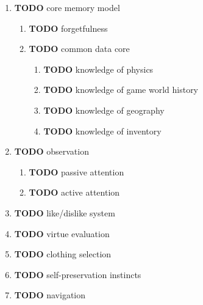 \documentclass[11pt]{article}
\begin{document}
\begin{enumerate}
\begin{enumerate}
\begin{enumerate}
\begin{enumerate}
\begin{enumerate}
\item {\bfseries\sffamily TODO} core memory model
\label{sec-5-4-1-4-3-6-3}

\begin{enumerate}
\item {\bfseries\sffamily TODO} forgetfulness
\label{sec-5-4-1-4-3-6-3-1}

\item {\bfseries\sffamily TODO} common data core
\label{sec-5-4-1-4-3-6-3-2}

\begin{enumerate}
\item {\bfseries\sffamily TODO} knowledge of physics
\label{sec-5-4-1-4-3-6-3-2-1}

\item {\bfseries\sffamily TODO} knowledge of game world history
\label{sec-5-4-1-4-3-6-3-2-2}

\item {\bfseries\sffamily TODO} knowledge of geography
\label{sec-5-4-1-4-3-6-3-2-3}

\item {\bfseries\sffamily TODO} knowledge of inventory
\label{sec-5-4-1-4-3-6-3-2-4}
\end{enumerate}
\end{enumerate}
\item {\bfseries\sffamily TODO} observation
\label{sec-5-4-1-4-3-6-4}

\begin{enumerate}
\item {\bfseries\sffamily TODO} passive attention
\label{sec-5-4-1-4-3-6-4-1}

\item {\bfseries\sffamily TODO} active attention
\label{sec-5-4-1-4-3-6-4-2}
\end{enumerate}
\item {\bfseries\sffamily TODO} like/dislike system
\label{sec-5-4-1-4-3-6-5}

\item {\bfseries\sffamily TODO} virtue evaluation
\label{sec-5-4-1-4-3-6-6}

\item {\bfseries\sffamily TODO} clothing selection
\label{sec-5-4-1-4-3-6-7}

\item {\bfseries\sffamily TODO} self-preservation instincts
\label{sec-5-4-1-4-3-6-8}

\item {\bfseries\sffamily TODO} navigation
\label{sec-5-4-1-4-3-6-9}


\end{enumerate}
\end{enumerate}
\end{enumerate}
\end{enumerate}
\end{enumerate}
\end{document}
